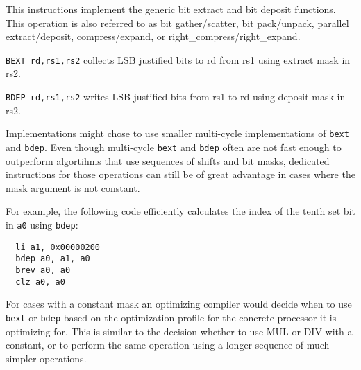 This instructions implement the generic bit extract and bit deposit functions.
This operation is also referred to as bit gather/scatter, bit pack/unpack,
parallel extract/deposit, compress/expand, or right\_compress/right\_expand.

\texttt{BEXT rd,rs1,rs2} collects LSB justified bits to rd from
rs1 using extract mask in rs2.

\texttt{BDEP rd,rs1,rs2} writes LSB justified bits from rs1 to rd using
deposit mask in rs2.



Implementations might chose to use smaller multi-cycle implementations of
\texttt{bext} and \texttt{bdep}. Even though multi-cycle \texttt{bext} and
\texttt{bdep} often are not fast enough to outperform algortihms that use
sequences of shifts and bit masks, dedicated instructions for those operations
can still be of great advantage in cases where the mask argument is not
constant.

For example, the following code efficiently calculates the index of the tenth
set bit in {\tt a0} using \texttt{bdep}:

\begin{verbatim}
  li a1, 0x00000200
  bdep a0, a1, a0
  brev a0, a0
  clz a0, a0
\end{verbatim}

For cases with a constant mask an optimizing compiler would decide when to use
\texttt{bext} or \texttt{bdep} based on the optimization profile for the
concrete processor it is optimizing for. This is similar to the decision
whether to use MUL or DIV with a constant, or to perform the same operation
using a longer sequence of much simpler operations.



%
%
%
%
%
%
%
%
%

